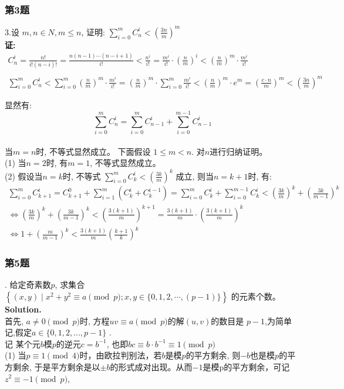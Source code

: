 \documentclass[UTF8]{article}
\begin{document}
\subsubsection{第3题}
\noindent 3.设 $m,n\in N, m \le n$, 证明: $\sum_{i=0}^{m}C_n^i < \left(\frac{3n}{m}\right)^m$
\\
\textbf{证:}\\
\begin{eqnarray*}
C_n^i=\frac{n!}{i!(n-i)!} = \frac{n(n-1)\cdots(n-i+1)}{i!} < \frac{n^i}{i!} = \frac{m^i}{i!}\cdot \left(\frac{n}{m}\right)^i < \left( \frac{n}{m}\right)^m \cdot \frac{m^i}{i!} \\
\\
\sum_{i=0}^{m}C_n^i < \sum_{i=0}^{m}\left( \frac{n}{m}\right)^m \cdot \frac{m^i}{i!} = \left( \frac{n}{m}\right)^m \cdot \sum_{i=0}^{m}\frac{m^i}{i!} < \left( \frac{n}{m}\right)^m \cdot e^m = \left( \frac{e\cdot n}{m}\right)^m < \left( \frac{3n}{m}\right)^m
\end{eqnarray*}

显然有: $$\sum_{i=0}^{m}C_n^i  = \sum_{i=0}^{m}C_{n-1}^i + \sum_{i=0}^{m-1}C_{n-1}^i $$ \\
当$m=n$时, 不等式显然成立。 下面假设 $1 \le m<n$. 对$n$进行归纳证明。\\
(1) 当$n=2$时, 有$m=1$, 不等式显然成立。 \\
(2) 假设当$n=k$时, 不等式 $\sum_{i=0}^{m}C_k^i < \left(\frac{3k}{m}\right)^k$ 成立, 则当$n=k+1$时, 有:\\
\begin{eqnarray*}
	\sum_{i=0}^{m}C_{k+1}^i = C_{k+1}^0 + \sum_{i=1}^{m}(C_k^i + C_k^{i-1}) = \sum_{i=0}^{m}C_k^i + \sum_{i=0}^{m-1}C_k^i < \left(\frac{3k}{m}\right)^k + \left(\frac{3k}{m-1}\right)^k \\
	\Longleftrightarrow \left(\frac{3k}{m}\right)^k + \left(\frac{3k}{m-1}\right)^k < \left(\frac{3(k+1)}{m}\right)^{k+1} = \frac{3(k+1)}{m} \cdot \left(\frac{3(k+1)}{m}\right)^{k}	\\
	\Longleftrightarrow 1+\left(\frac{m}{m-1}\right)^k < \frac{3(k+1)}{m} \left(\frac{k+1}{k}\right)^{k}
\end{eqnarray*}

\subsubsection{第5题}
. 给定奇素数$p$, 求集合$\left\{(x,y)\mid x^2+y^2 \equiv a \pmod{p}; x,y\in \{0,1,2,\cdots ,(p-1)\} \right\}$ 的元素个数。
\\
\textbf{Solution.} \\
首先, $a \ne 0 \pmod p$时, 方程$uv\equiv a \pmod p $的解$(u,v)$的数目是 $p-1$,为简单记,假定$a\in\{0,1,2,...,p-1\}$ .\\
记 某个元$b$模$p$的逆元$c=b^{-1}$, 也即$bc\equiv b\cdot b^{-1}\equiv1\pmod{p}$\\
(1) 当$p\equiv1 \pmod{4}$时，由欧拉判别法，若$b$是模$p$的平方剩余, 则$-b$也是模$p$的平方剩余, 于是平方剩余是以$\pm b$的形式成对出现。从而$-1$是模p的平方剩余，可记$z^2\equiv -1 \pmod{p}$, 
\end{document}
